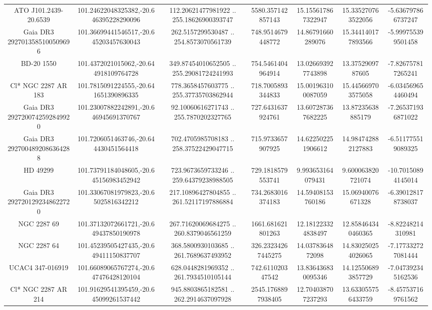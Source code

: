 \begin{table}
\begin{tabular}{ccccccc}
ATO J101.2439-20.6539 & 101.24622048325382,-20.646395228290096 & 112.20621477981922 .. 255.18626900393747 & 5580.357142857143 & 15.155617867322947 & 15.335270763522056 & -5.636797866737247 \\
Gaia DR3 2927013585100509696 & 101.36699441546517,-20.645203457630043 & 262.5157299530487 .. 254.8573070561739 & 748.9514679448772 & 14.86791660289076 & 15.344140177893566 & -5.999755399501458 \\
BD-20  1550 & 101.4372021015062,-20.644918109764728 & 349.87454010652505 .. 255.29081724241993 & 754.5461404964914 & 13.026693927743898 & 13.3752909787605 & -7.826757817265241 \\
Cl* NGC 2287     AR     183 & 101.7815091224555,-20.641651390896335 & 778.3658457603775 .. 255.37735703862944 & 718.7005893344833 & 15.001963100087059 & 15.445669703575058 & -6.034569654460494 \\
Gaia DR3 2927200742592849920 & 101.23007882242891,-20.646945691370767 & 92.10060616271743 .. 255.7870202327765 & 727.6431637924761 & 13.607287367682225 & 13.87235638885179 & -7.265371936871022 \\
Gaia DR3 2927004892086364288 & 101.7206051463746,-20.644430451564418 & 702.4705985708183 .. 258.37522429047715 & 715.9733657907925 & 14.622502251906612 & 14.984742882127883 & -6.511775519089325 \\
HD  49299 & 101.73791184048605,-20.645156983452942 & 723.9673659733246 .. 259.64379238988505 & 729.1818579553741 & 9.993653164079431 & 9.600063820721074 & -10.70150894145014 \\
Gaia DR3 2927201292348622720 & 101.33067081979823,-20.65025816342212 & 217.10896427804855 .. 261.52117197886884 & 734.2683016374183 & 14.59408153760186 & 15.06940076671328 & -6.390128178738037 \\
NGC  2287    69 & 101.37132072661721,-20.649437850190978 & 267.71620069684275 .. 260.8379046561259 & 1661.681621801263 & 12.181223324838497 & 12.858464340460365 & -8.82248214310981 \\
NGC  2287    64 & 101.45239505427435,-20.649411150837707 & 368.5800930103685 .. 261.7689637493952 & 326.23234267445275 & 14.0378364872098 & 14.830250254026065 & -7.177332727081444 \\
UCAC4 347-016919 & 101.66089065767274,-20.647476428120104 & 628.0448281969352 .. 261.7934510105144 & 742.611020347542 & 13.836436830095346 & 14.125506893857729 & -7.047392345162536 \\
Cl* NGC 2287     AR     214 & 101.91629541395459,-20.645099261537442 & 945.8803865182581 .. 262.2914637097928 & 2545.1768897938405 & 12.704038707237293 & 13.633055756433759 & -8.457537169761562 \\

\end{tabular}
\end{table}
